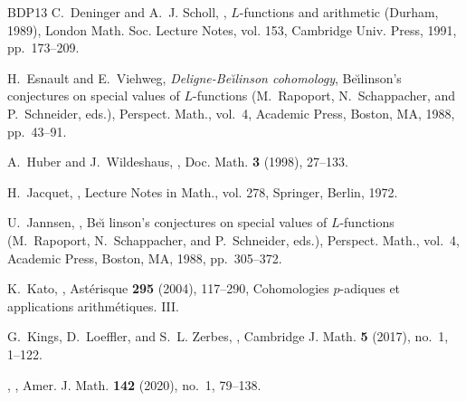 \documentclass[11pt, a4paper, reqno]{amsart}
\theoremstyle{definition}
\theoremstyle{plain}
\theoremstyle{remark}
\begin{document}
\begin{thebibliography}{BDP13}
C.~Deninger and A.~J. Scholl,
  , {$L$}-functions and arithmetic ({D}urham,
  1989), London Math. Soc. Lecture Notes, vol. 153, Cambridge Univ. Press,
  1991, pp.~173--209. 

H.~Esnault and E.~Viehweg, \emph{Deligne-{B}e{\u\i}linson cohomology},
  Be{\u\i}linson's conjectures on special values of {$L$}-functions
  (M.~Rapoport, N.~Schappacher, and P.~Schneider, eds.), Perspect. Math.,
  vol.~4, Academic Press, Boston, MA, 1988, pp.~43--91. 

A.~Huber and J.~Wildeshaus,
  , Doc. Math.
  \textbf{3} (1998), 27--133. 

H.~Jacquet,
  , Lecture Notes in Math., vol. 278,
  Springer, Berlin, 1972. 

U.~Jannsen,
  , Be\u\i
  linson's conjectures on special values of {$L$}-functions (M.~Rapoport,
  N.~Schappacher, and P.~Schneider, eds.), Perspect. Math., vol.~4, Academic
  Press, Boston, MA, 1988, pp.~305--372. 

K.~Kato,
  ,
  Ast{\'e}risque \textbf{295} (2004), 117--290, Cohomologies $p$-adiques et
  applications arithm{\'e}tiques. III. 

G.~Kings, D.~Loeffler, and S.~L. Zerbes,
  , Cambridge J. Math. \textbf{5}
  (2017), no.~1, 1--122. 

\bysame,
  , Amer. J. Math. \textbf{142} (2020), no.~1,
  79--138.


\end{thebibliography}
\end{document}
